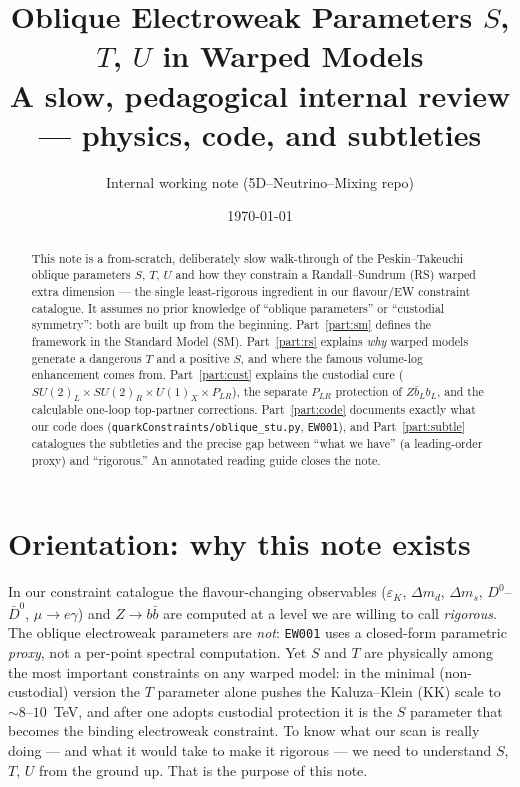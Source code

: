 \documentclass[11pt]{article}
\title{\bf Oblique Electroweak Parameters $S$, $T$, $U$ in Warped Models\\[4pt]
\large A slow, pedagogical internal review --- physics, code, and subtleties}
\author{Internal working note (5D--Neutrino--Mixing repo)}
\date{\today}
\newcommand{\eps}{\varepsilon}
\newcommand{\SUL}{SU(2)_L}
\newcommand{\SUR}{SU(2)_R}
\newcommand{\UX}{U(1)_X}
\newcommand{\PLR}{P_{LR}}
\newcommand{\code}[1]{\texttt{#1}}
\theoremstyle{definition}
\begin{document}
\maketitle

\begin{abstract}
\noindent
This note is a from-scratch, deliberately slow walk-through of the
Peskin--Takeuchi oblique parameters $S$, $T$, $U$ and how they constrain a
Randall--Sundrum (RS) warped extra dimension --- the single least-rigorous
ingredient in our flavour/EW constraint catalogue. It assumes no prior
knowledge of ``oblique parameters'' or ``custodial symmetry'': both are built
up from the beginning. Part~\ref{part:sm} defines the framework in the Standard
Model (SM). Part~\ref{part:rs} explains \emph{why} warped models generate a
dangerous $T$ and a positive $S$, and where the famous volume-log enhancement
comes from. Part~\ref{part:cust} explains the custodial cure
($\SUL\times\SUR\times\UX\times\PLR$), the separate $\PLR$ protection of
$Z\bar b_L b_L$, and the calculable one-loop top-partner corrections.
Part~\ref{part:code} documents exactly what our code does
(\code{quarkConstraints/oblique\_stu.py}, \code{EW001}), and
Part~\ref{part:subtle} catalogues the subtleties and the precise gap between
``what we have'' (a leading-order proxy) and ``rigorous.'' An annotated reading
guide closes the note.
\end{abstract}

\tableofcontents

\part*{Orientation: why this note exists}

In our constraint catalogue the flavour-changing observables
($\eps_K$, $\Delta m_d$, $\Delta m_s$, $D^0$--$\bar D^0$, $\mu\to e\gamma$) and
$Z\to b\bar b$ are computed at a level we are willing to call
\emph{rigorous}. The oblique electroweak parameters are \emph{not}: \code{EW001}
uses a closed-form parametric \emph{proxy}, not a per-point spectral
computation. Yet $S$ and $T$ are physically among the most important
constraints on any warped model: in the minimal (non-custodial) version the
$T$ parameter alone pushes the Kaluza--Klein (KK) scale to
$\sim 8$--$10$~TeV, and after one adopts custodial protection it is the $S$
parameter that becomes the binding electroweak constraint. To know what our
scan is really doing --- and what it would take to make it rigorous --- we need
to understand $S$, $T$, $U$ from the ground up. That is the purpose of this
note.
\end{document}
